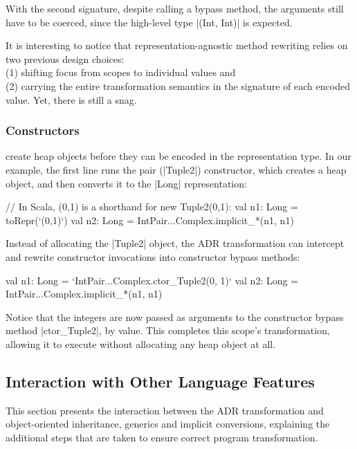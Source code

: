 With the second signature, despite calling a bypass method, the arguments still have to be coerced, since the high-level type |(Int, Int)| is expected.

It is interesting to notice that representation-agnostic method rewriting relies on two previous design choices: \\
(1) shifting focus from scopes to individual values and \\
(2) carrying the entire transformation semantics in the signature of each encoded value.
Yet, there is still a snag.


\subsubsection*{Constructors} create heap objects before they can be encoded in the representation type. In our example, the first line runs the pair (|Tuple2|) constructor, which creates a heap object, and then converts it to the |Long| representation:

\begin{lstlisting-nobreak}
// In Scala, (0,1) is a shorthand for new Tuple2(0,1):
val n1: Long = toRepr(`(0,1)`)
val n2: Long = IntPair...Complex.implicit_*(n1, n1)
\end{lstlisting-nobreak}

Instead of allocating the |Tuple2| object, the ADR transformation can intercept and rewrite constructor invocations into constructor bypass methods:

\begin{lstlisting-nobreak}
val n1: Long = `IntPair...Complex.ctor_Tuple2(0, 1)`
val n2: Long = IntPair...Complex.implicit_*(n1, n1)
\end{lstlisting-nobreak}

Notice that the integers are now passed as arguments to the constructor bypass method |ctor_Tuple2|, by value. This completes this scope's transformation, allowing it to execute without allocating any heap object at all.

\subsection{Interaction with Other Language Features}
\label{sec:ildl:language-features}

This section presents the interaction between the ADR transformation and object-oriented inheritance, generics and implicit conversions, explaining the additional steps that are taken to ensure correct program transformation.

